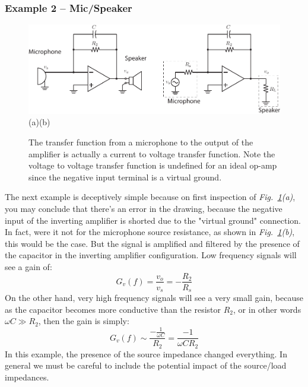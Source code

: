 \subsubsection{Example 2 – Mic/Speaker}
\begin{figure}[tb]
\centering
\includegraphics[width=\columnwidth]{ex_microphone}\\
(a)\hspace{8cm}(b)
\caption{The transfer function from a microphone to the output of the amplifier is actually a current to voltage transfer function.  Note the voltage to voltage transfer function is undefined for an ideal op-amp since the negative input terminal is a virtual ground.}
\label{fig:microphone}
\end{figure}
The next example is deceptively simple because on first inspection of \emph{Fig.~\ref{fig:microphone}(a)}, you may conclude that there's an error in the drawing, because the negative input of the inverting amplifier is shorted due to the "virtual ground" connection.  In fact, were it not for the microphone source resistance, as shown in  \emph{Fig.~\ref{fig:microphone}(b)}, this would be the case. But the signal is amplified and filtered by the presence of the capacitor in the inverting amplifier configuration.
\newpage
\noindent
Low frequency signals will see a gain of:
    \begin{equation}
        G_v(f) = \frac{v_{o}}{v_s } = -\frac{R_2}{R_s}
    \end{equation}
On the other hand, very high frequency signals will see a very small gain, because as the capacitor becomes more conductive than the resistor $R_2$, or in other words $\omega C \gg R_2$, then the gain is simply:
    \begin{equation}
        G_v(f) \sim \frac{-\frac{1}{\omega C}}{R_2 } = \frac{-1}{\omega C R_2 }
    \end{equation}
In this example, the presence of the source impedance changed everything.  In general we must be careful to include the potential impact of the source/load impedances.
\newpage
